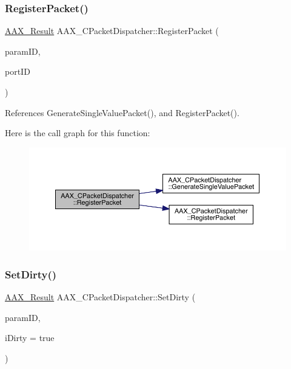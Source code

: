\subsubsection{\texorpdfstring{RegisterPacket()}{RegisterPacket()}\hspace{0.1cm}{\footnotesize\ttfamily [3/3]}}
{\footnotesize\ttfamily \mbox{\hyperlink{a00392_a4d8f69a697df7f70c3a8e9b8ee130d2f}{A\+A\+X\+\_\+\+Result}} A\+A\+X\+\_\+\+C\+Packet\+Dispatcher\+::\+Register\+Packet (\begin{DoxyParamCaption}\item[{\mbox{\hyperlink{a00392_a1440c756fe5cb158b78193b2fc1780d1}{A\+A\+X\+\_\+\+C\+Param\+ID}}}]{param\+ID,  }\item[{\mbox{\hyperlink{a00392_ae807f8986143820cfb5d6da32165c9c7}{A\+A\+X\+\_\+\+C\+Field\+Index}}}]{port\+ID }\end{DoxyParamCaption})\hspace{0.3cm}{\ttfamily [inline]}}



References Generate\+Single\+Value\+Packet(), and Register\+Packet().

Here is the call graph for this function\+:
\nopagebreak
\begin{figure}[H]
\begin{center}
\leavevmode
\includegraphics[width=350pt]{a01529_a767959a133afaa2e44bfafc79d0b5c69_cgraph}
\end{center}
\end{figure}
\mbox{\label{a01529_a6d4254a842eeee46a227ec761619efb5}} 
\subsubsection{\texorpdfstring{SetDirty()}{SetDirty()}}
{\footnotesize\ttfamily \mbox{\hyperlink{a00392_a4d8f69a697df7f70c3a8e9b8ee130d2f}{A\+A\+X\+\_\+\+Result}} A\+A\+X\+\_\+\+C\+Packet\+Dispatcher\+::\+Set\+Dirty (\begin{DoxyParamCaption}\item[{\mbox{\hyperlink{a00392_a1440c756fe5cb158b78193b2fc1780d1}{A\+A\+X\+\_\+\+C\+Param\+ID}}}]{param\+ID,  }\item[{bool}]{i\+Dirty = {\ttfamily true} }\end{DoxyParamCaption})}


